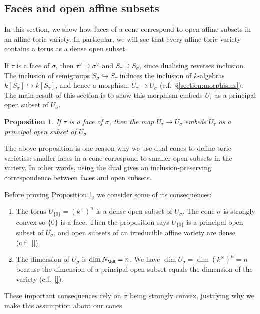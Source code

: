 \documentclass[12pt]{amsart}
\theoremstyle{plain}
\newtheorem{proposition}[theorem]{Proposition}
\theoremstyle{definition}
\begin{document}
\subsection{Faces and open affine subsets}\label{section:facesandopenaffinesubsets}
In this section, we show how faces of a cone correspond to open affine subsets in an affine toric variety.
In particular, we will see that every affine toric variety contains a torus as a dense open subset.

If $\tau$ is a face of $\sigma$, then $\tau^\vee \supseteq \sigma^\vee$ and $S_\tau \supseteq S_\sigma$, since dualising reverses inclusion.
The inclusion of semigroups $S_\sigma \hookrightarrow S_\tau$ induces the inclusion of $k$-algebras $k[S_\sigma] \hookrightarrow k[S_\tau]$, and hence a morphism $U_\tau \to U_\sigma$ (c.f.\ \S \ref{section:morphisms}).
The main result of this section is to show this morphism embeds $U_\tau$ as a principal open subset of $U_\sigma$.

\begin{proposition}\label{proposition:facesopensubsets}
If $\tau$ is a face of $\sigma$, then the map $U_\tau \to U_\sigma$ embeds $U_\tau$ as a principal open subset of $U_\sigma$.
\end{proposition}

The above proposition is one reason why we use dual cones to define toric varieties: smaller faces in a cone correspond to smaller open subsets in the variety.
In other words, using the dual gives an inclusion-preserving correspondence between faces and open subsets.

Before proving Proposition \ref{proposition:facesopensubsets}, we consider some of its consequences:
\begin{enumerate}
\item The torus $U_{\{0\}} = (k^\times)^n$ is a dense open subset of $U_\sigma$. The cone $\sigma$ is strongly convex so $\{0\}$ is a face. Then the proposition says $U_{\{0\}}$ is a principal open subset of $U_\sigma$, and open subsets of an irreducible affine variety are dense (c.f.\ \ref{}).
\item The dimension of $U_\sigma$ is $\dim N_\RR = n$. We have $\dim U_\sigma = \dim (k^\times)^n = n$ because the dimension of a principal open subset equals the dimension of the variety (c.f.\ \ref{}).
\end{enumerate}
\noindent These important consequences rely on $\sigma$ being strongly convex, justifying why we make this assumption about our cones.
\end{document}
